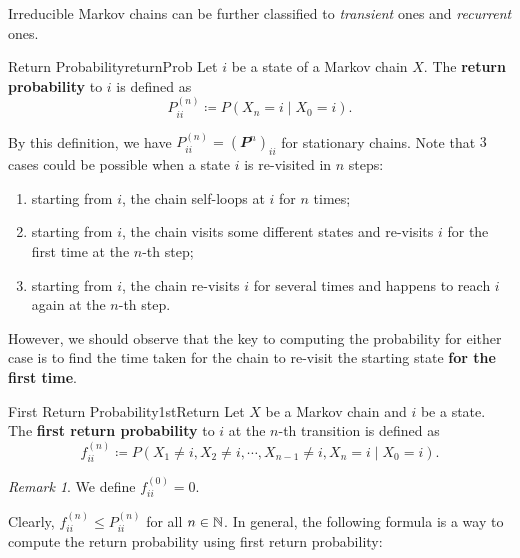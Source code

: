 \documentclass[math, code]{amznotes}
\theoremstyle{remark}
\newtheorem*{remark}{Remark}
\begin{document}
Irreducible Markov chains can be further classified to \textit{transient} ones and \textit{recurrent} ones.
\begin{dfnbox}{Return Probability}{returnProb}
    Let $i$ be a state of a Markov chain $X$. The {\color{red} \textbf{return probability}} to $i$ is defined as 
    \begin{equation*}
        P^{\left(n\right)}_{ii} \coloneqq P\left(X_n = i \mid X_0 = i\right).
    \end{equation*}
\end{dfnbox}
By this definition, we have $P^{\left(n\right)}_{ii} = \left(\mathbfit{P}^n\right)_{ii}$ for stationary chains. Note that $3$ cases could be possible when a state $i$ is re-visited in $n$ steps:
\begin{enumerate}
    \item starting from $i$, the chain self-loops at $i$ for $n$ times;
    \item starting from $i$, the chain visits some different states and re-visits $i$ for the first time at the $n$-th step;
    \item starting from $i$, the chain re-visits $i$ for several times and happens to reach $i$ again at the $n$-th step.
\end{enumerate}
However, we should observe that the key to computing the probability for either case is to find the time taken for the chain to re-visit the starting state \textbf{for the first time}.
\begin{dfnbox}{First Return Probability}{1stReturn}
    Let $X$ be a Markov chain and $i$ be a state. The {\color{red} \textbf{first return probability}} to $i$ at the $n$-th transition is defined as 
    \begin{equation*}
        f_{ii}^{\left(n\right)} \coloneqq P\left(X_1 \neq i, X_2 \neq i, \cdots, X_{n - 1} \neq i, X_n = i \mid X_0 = i\right).
    \end{equation*}
\end{dfnbox}
\begin{notebox}
    \begin{remark}
        We define $f^{\left(0\right)}_{ii} = 0$.
    \end{remark}
\end{notebox}
Clearly, $f_{ii}^{\left(n\right)} \leq P_{ii}^{\left(n\right)}$ for all $n \in \mathbb{N}$. In general, the following formula is a way to compute the return probability using first return probability:
\end{document}
